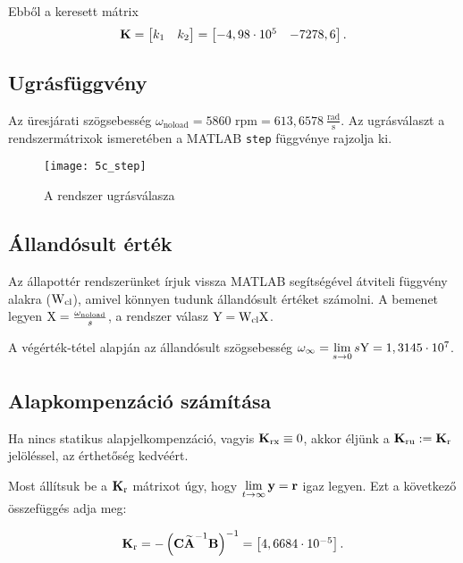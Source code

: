 Ebből a keresett mátrix
\begin{equation}
	\boldsymbol{\mathrm{K}} = \begin{bmatrix}k_1&k_2\end{bmatrix} = \begin{bmatrix}-4,98\cdot10^5& -7278,6\end{bmatrix}.
\end{equation}


\subsection{Ugrásfüggvény}

Az üresjárati szögsebesség $\omega_\text{noload} = 5860\text{ rpm} = 613,6578~\frac{\text{rad}}{\text{s}}$. Az ugrásválaszt a rendszermátrixok ismeretében a MATLAB \verb|step| függvénye rajzolja ki.

\begin{figure}[H]
	\centering
	\texttt{[image: 5c\_step]}
	\caption{A rendszer ugrásválasza}
	\label{fig:5c_step}
\end{figure}



\subsection{Állandósult érték}\label{subsec:5d}

Az állapottér rendszerünket írjuk vissza MATLAB segítségével átviteli függvény
alakra ($\mathrm{W}_\text{cl}$), amivel könnyen tudunk állandósult értéket számolni.
A bemenet legyen $\mathrm{X} = \frac{\omega_\text{noload}}{s}$, a rendszer válasz $\mathrm{Y} = \mathrm{W}_\text{cl}\mathrm{X}$.

A végérték-tétel alapján az állandósult szögsebesség $\omega_\infty = \lim\limits_{s\rightarrow 0}s\mathrm{Y} = 1,3145\cdot10^7$.%


\subsection{Alapkompenzáció számítása}

Ha nincs statikus alapjelkompenzáció, vagyis $\boldsymbol{\mathrm{K}}_\text{rx}\equiv0$, akkor éljünk
a $\boldsymbol{\mathrm{K}}_\text{ru}:=\boldsymbol{\mathrm{K}}_\text{r}$ jelöléssel, az érthetőség kedvéért.

Most állítsuk be a $\boldsymbol{\mathrm{K}}_\text{r}$ mátrixot úgy, hogy
$\lim\limits_{t\rightarrow\infty}\boldsymbol{\mathrm{y}}=\boldsymbol{\mathrm{r}}$ igaz legyen.
Ezt a következő összefüggés adja meg:

\begin{equation}
	\boldsymbol{\mathrm{K}}_\text{r} = -\left(\boldsymbol{\mathrm{C}}\widetilde{\boldsymbol{\mathrm{A}}}^{-1}\boldsymbol{\mathrm{B}}\right)^{-1} = \begin{bmatrix}4,6684\cdot10^{-5}\end{bmatrix}.
\end{equation}

